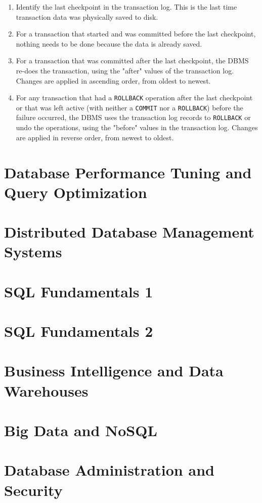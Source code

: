 \documentclass[a4paper, 11pt, titlepage]{report}
\begin{document}
\begin{enumerate}
\item Identify the last checkpoint in the transaction log. This is the last time transaction
data was physically saved to disk.
\item For a transaction that started and was committed before the last checkpoint, nothing
needs to be done because the data is already saved.
\item For a transaction that was committed after the last checkpoint, the DBMS re-does
the transaction, using the "after" values of the transaction log. Changes are applied in
ascending order, from oldest to newest.
\item For any transaction that had a \texttt{ROLLBACK} operation after the last checkpoint or that was left active (with neither a \texttt{COMMIT} nor a \texttt{ROLLBACK}) before the failure occurred, the DBMS uses the transaction log records to \texttt{ROLLBACK} or undo the operations, using the "before" values in the transaction log. Changes are applied in reverse order, from newest to oldest.
\end{enumerate}
\chapter{Database Performance Tuning and Query Optimization}
\chapter{Distributed Database Management Systems}
\chapter{SQL Fundamentals 1}
\chapter{SQL Fundamentals 2}
\chapter{Business Intelligence and Data Warehouses}
\chapter{Big Data and NoSQL}
\chapter{Database Administration and Security}
\end{document}
